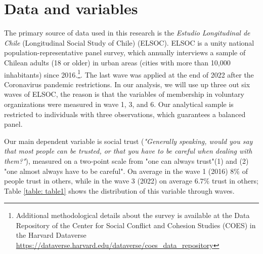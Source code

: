 \section{Data and variables}
The primary source of data used in this research is the \textit{Estudio Longitudinal de Chile} (Longitudinal Social Study of Chile) (ELSOC). ELSOC is a unity national population-representative panel survey, which annually interviews a sample of Chilean adults (18 or older) in urban areas (cities with more than 10,000 inhabitants) since 2016.\footnote{Additional methodological details about the survey is available at the Data Repository of the Center for Social Conflict and Cohesion Studies (COES) in the Harvard Dataverse \url{https://dataverse.harvard.edu/dataverse/coes_data_repository}}. The last wave was applied at the end of 2022 after the Coronavirus pandemic restrictions. In our analysis, we will use up three out six waves of ELSOC, the reason is that the variables of membership in voluntary organizations were measured in wave 1, 3, and 6. Our analytical sample is restricted to individuals with three observations, which guarantees a balanced panel. 

\bigskip

Our main dependent variable is social trust (\textit{"Generally speaking, would you say that most people can be trusted, or that you have to be careful when dealing with them?"}), measured on a two-point scale from "one can always trust"(1) and (2) "one almost always have to be careful". On average in the wave 1 (2016) $8\%$ of people trust in others, while in the wave 3 (2022) on average $6.7\%$ trust in others; Table \ref{table: table1} shows the distribution of this variable through waves.

\bigskip


